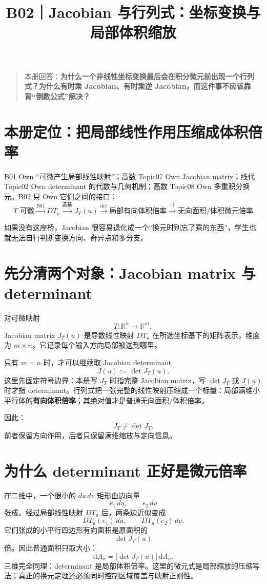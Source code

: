 \documentclass[profile=standard]{ipara-handbook}
\title{B02｜Jacobian 与行列式：坐标变换与局部体积缩放}
\author{}
\date{}
\begin{document}
\maketitle

\begin{quote}
本册回答：\textbf{为什么一个非线性坐标变换最后会在积分微元前出现一个行列式？为什么有时乘 Jacobian、有时乘逆 Jacobian，而这件事不应该靠背“倒数公式”解决？}
\end{quote}

\section{本册定位：把局部线性作用压缩成体积倍率}
B01 Own “可微产生局部线性映射”；高数 Topic07 Own Jacobian matrix；线代 Topic02 Own determinant 的代数与几何机制；高数 Topic08 Own 多重积分换元。B02 只 Own 它们之间的接口：
\[
\boxed{
T\text{ 可微}
\xrightarrow{\text{B01}}
DT_u
\xrightarrow{\text{选基}}
J_T(u)
\xrightarrow{\det}
\text{局部有向体积倍率}
\xrightarrow{\lvert\cdot\rvert}
\text{无向面积/体积微元倍率}
}
\]

如果没有这座桥，Jacobian 很容易退化成一个“换元时别忘了乘的东西”，学生也就无法自行判断变换方向、奇异点和多分支。

\section{先分清两个对象：Jacobian matrix 与 determinant}
对可微映射
\[
T:\mathbb R^n\to\mathbb R^m,
\]
Jacobian matrix $J_T(u)$ 是导数线性映射 $DT_u$ 在所选坐标基下的矩阵表示，维度为 $m\times n$。它记录每个输入方向局部被送到哪里。

只有 $m=n$ 时，才可以继续取 Jacobian determinant
\[
J(u):=\det J_T(u).
\]
这里先固定符号边界：本册写 $J_T$ 时指完整 Jacobian matrix，写 $\det J_T$ 或 $J(u)$ 时才指 determinant。行列式把一张完整的线性映射压缩成一个标量：局部满维小平行体的\textbf{有向体积倍率}；其绝对值才是普通无向面积/体积倍率。

因此：
\[
\boxed{J_T\neq\det J_T.}
\]
前者保留方向作用，后者只保留满维缩放与定向信息。

\section{为什么 determinant 正好是微元倍率}
在二维中，一个很小的 $du\,dv$ 矩形由边向量
\[
e_1\,du,\qquad e_2\,dv
\]
张成。经过局部线性映射 $DT_u$ 后，两条边近似变成
\[
DT_u(e_1)\,du,\qquad DT_u(e_2)\,dv.
\]
它们张成的小平行四边形有向面积是原面积的
\[
\det J_T(u)
\]
倍。因此普通面积只取大小：
\[
\boxed{\mathrm{d}A_x=\lvert\det J_T(u)\rvert\,\mathrm{d}A_u.}
\]
三维完全同理：determinant 是局部体积倍率。这里的微元式是局部缩放的压缩写法；真正的换元定理还必须同时控制区域覆盖与映射正则性。
\end{document}

